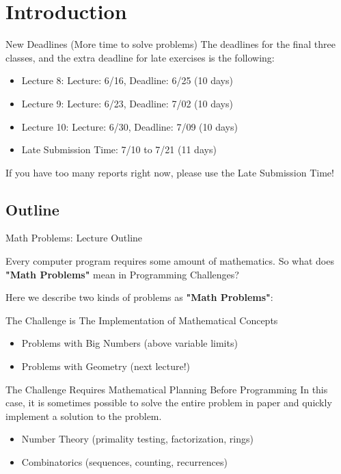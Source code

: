 \section{Introduction}

\begin{frame}{New Deadlines (More time to solve problems)}
  The deadlines for the final three classes, and the extra deadline for late exercises is the following:\bigskip

  \begin{itemize}
    \item Lecture 8: Lecture: 6/16, Deadline: 6/25 (10 days)
    \item Lecture 9: Lecture: 6/23, Deadline: 7/02 (10 days)
    \item Lecture 10: Lecture: 6/30, Deadline: 7/09 (10 days)
    \item Late Submission Time: 7/10 to 7/21 (11 days)
  \end{itemize}\bigskip

  If you have too many reports right now, please use the Late Submission Time!  
\end{frame}

\subsection{Outline}
\begin{frame}{Math Problems: Lecture Outline}

  Every computer program requires some amount of mathematics. So what does {\bf "Math Problems"} mean in Programming Challenges?\bigskip

  Here we describe two kinds of problems as {\bf "Math Problems"}:

  \begin{block}{The Challenge is The Implementation of Mathematical Concepts}
    \begin{itemize}
      \item Problems with Big Numbers (above variable limits)
      \item Problems with Geometry (next lecture!)
    \end{itemize}
  \end{block}
  \begin{exampleblock}{The Challenge Requires Mathematical Planning Before Programming}
    In this case, it is sometimes possible to solve the entire problem in paper and quickly implement a solution to the problem.
    \begin{itemize}
      \item Number Theory (primality testing, factorization, rings)
      \item Combinatorics (sequences, counting, recurrences)
    \end{itemize}
  \end{exampleblock}
\end{frame}
